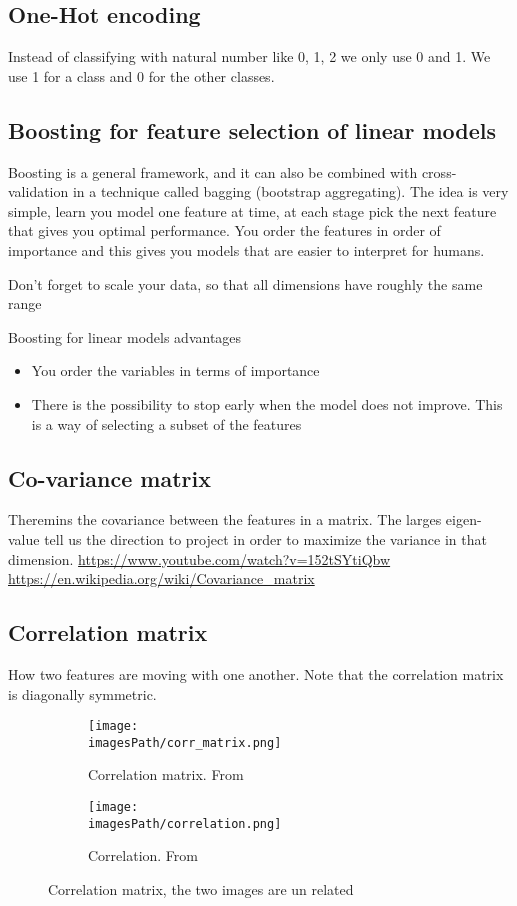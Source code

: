 \begin{multicols}{2}
\subsection{One-Hot encoding}
Instead of classifying with natural number like 0, 1, 2 we only 
use 0 and 1. We use 1 for a class and 0 for the other classes.

\subsection{Boosting for feature selection of linear models}
Boosting is a general framework, and it can also be combined with
cross-validation in a technique called bagging (bootstrap aggregating).
The idea is very simple, learn you model one feature at time, at each stage
pick the next feature that gives you optimal performance.
You order the features in order of importance and this gives you models
that are easier to interpret for humans.

Don’t forget to scale your data, so that all dimensions have roughly the
same range

Boosting for linear models advantages
\begin{itemize}
    \item You order the variables in terms of importance
    \item There is the possibility to stop early when the model does not
improve. This is a way of selecting a subset of the features
\end{itemize}

\subsection{Co-variance matrix}
Theremins the covariance between the features in a matrix. 
The larges eigen-value tell us the direction to project in order to 
maximize the variance in that dimension.
\url{https://www.youtube.com/watch?v=152tSYtiQbw}
\url{https://en.wikipedia.org/wiki/Covariance_matrix}


\subsection{Correlation matrix}
How two features are moving with one another. Note that the correlation matrix is diagonally symmetric.
\begin{figure}[H]
     \centering
     \begin{subfigure}[b]{8cm}
         \centering
         \texttt{[image: \\imagesPath/corr\_matrix.png]}
         \caption{Correlation matrix. From \cite{iml}}
     \end{subfigure}
     \hfill
     \begin{subfigure}[b]{8cm}
         \centering
         \texttt{[image: \\imagesPath/correlation.png]}
         \caption{Correlation. From \cite{iml}}
     \end{subfigure}
    \caption{Correlation matrix, the two images are un related}
\end{figure}



\end{multicols}
